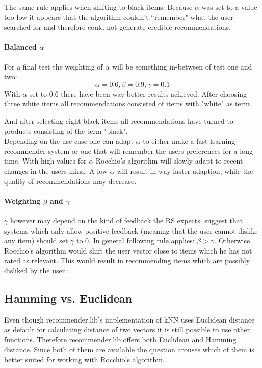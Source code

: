 The same rule applies when shifting to black items.
Because $\alpha$ was set to a value too low it appears that the algorithm couldn't ``remember" what the user searched for and therefore could not generate credible recommendations.
\\

\paragraph{Balanced $\alpha$}
For a final test the weighting of $\alpha$ will be something in-between of test one and two:
$$\alpha = 0.6, \beta = 0.9, \gamma = 0.1$$
With $\alpha$ set to 0.6 there have been way better results achieved.
After choosing three white items all recommendations consisted of items with "white" as term.

And after selecting eight black items all recommendations have turned to products consisting of the term "black".
\\

Depending on the use-case one can adapt $\alpha$ to either make a fast-learning recommender system or one that will remember the users preferences for a long time.
With high values for $\alpha$ Rocchio's algorithm will slowly adapt to recent changes in the users mind.
A low $\alpha$ will result in way faster adaption, while the quality of recommendations may decrease.

\paragraph{Weighting $\beta$ and $\gamma$}
$\gamma$ however may depend on the kind of feedback the RS expects.
\citeauthor{manning:2009} suggest that systems which only allow positive feedback (meaning that the user cannot dislike any item) should set $\gamma$ to 0.\citep[p.~183]{manning:2009}
In general following rule applies: $\beta > \gamma$.
Otherwise Rocchio's algorithm would shift the user vector close to items which he has not rated as relevant.
This would result in recommending items which are possibly disliked by the user.


\subsection{Hamming vs. Euclidean}
\label{sec:hamming-vs-euclidean}
Even though recommender.lib's implementation of kNN uses Euclidean distance as default for calculating distance of two vectors it is still possible to use other functions.
Therefore recommender.lib offers both Euclidean and Hamming distance.
Since both of them are available the question arouses which of them is better suited for working with Rocchio's algorithm.

